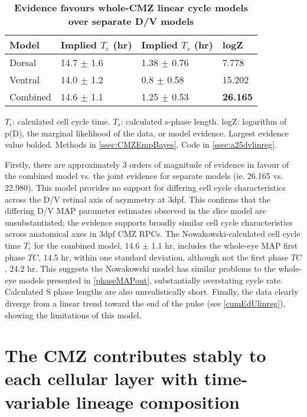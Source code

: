 \begin{table}[!ht]
    \centering
    \caption{{\bf Evidence favours whole-CMZ linear cycle models over separate D/V models}}
    \begin{tabular}{|l|l|l|l|} 
        \hline {\bf Model} & {\bf Implied $T_c$ (hr)} & {\bf Implied $T_s$ (hr)} & {\bf logZ}\\ \hline 
        Dorsal & 14.7 $\pm$ 1.6 & 1.38 $\pm$ 0.76 & 7.778\\ \hline 
        Ventral & 14.0 $\pm$ 1.2 & 0.8 $\pm$ 0.58 & 15.202\\ \hline
        Combined & 14.6 $\pm$ 1.1 & 1.25 $\pm$ 0.53 & {\bf26.165}\\ \hline
    \end{tabular}
   
    \begin{flushleft} $T_c$: calculated cell cycle time. $T_s$: calculated s-phase length. logZ: logarithm of p(D), the marginal likelihood of the data, or model evidence.  Largest evidence value bolded.
    Methods in \autoref{ssec:CMZEmpBayes}.
    Code in \autoref{ssec:a25dvlinreg}.    

    \end{flushleft}
    \label{cumEdUtable}
\end{table}

Firstly, there are approximately 3 orders of magnitude of evidence in favour of the combined model vs. the joint evidence for separate models (ie. 26.165 vs. 22.980). This model provides no support for differing cell cycle characteristics across the D/V retinal axis of asymmetry at 3dpf. This confirms that the differing D/V MAP parameter estimates observed in the slice model are unsubstantiated; the evidence supports broadly similar cell cycle characteristics across anatomical axes in 3dpf CMZ RPCs. The Nowakowski-calculated cell cycle time $T_c$ for the combined model, 14.6 $\pm$ 1.1 hr, includes the whole-eye MAP first phase $TC$, 14.5 hr, within one standard deviation, although not the first phase $TC$, 24.2 hr. This suggests the Nowakowski model has similar problems to the whole-eye models presented in \autoref{phaseMAPout}, substantially overstating cycle rate. Calculated S phase lengths are also unrealistically short. Finally, the data clearly diverge from a linear trend toward the end of the pulse (see \autoref{cumEdUlinreg}), showing the limitations of this model.

\section{The CMZ contributes stably to each cellular layer with time-variable lineage composition}

